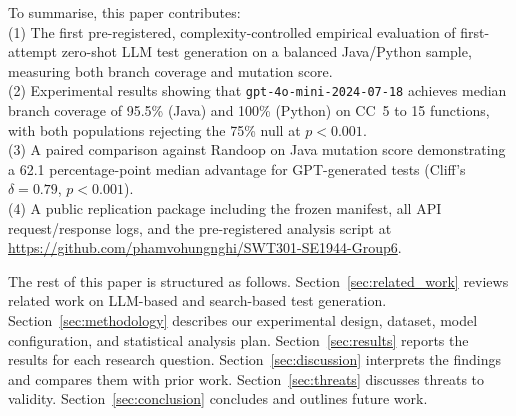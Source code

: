 To summarise, this paper contributes:\\
(1) The first pre-registered, complexity-controlled empirical evaluation of first-attempt zero-shot LLM test generation on a balanced Java/Python sample, measuring both branch coverage and mutation score.\\
(2) Experimental results showing that \texttt{gpt-4o-mini-2024-07-18} achieves median branch coverage of 95.5\% (Java) and 100\% (Python) on CC~5 to 15 functions, with both populations rejecting the 75\% null at $p < 0.001$.\\
(3) A paired comparison against Randoop on Java mutation score demonstrating a 62.1 percentage-point median advantage for GPT-generated tests (Cliff's $\delta = 0.79$, $p < 0.001$).\\
(4) A public replication package including the frozen manifest, all API request/response logs, and the pre-registered analysis script at \url{https://github.com/phamvohungnghi/SWT301-SE1944-Group6}.

The rest of this paper is structured as follows. Section~\ref{sec:related_work} reviews related work on LLM-based and search-based test generation. Section~\ref{sec:methodology} describes our experimental design, dataset, model configuration, and statistical analysis plan. Section~\ref{sec:results} reports the results for each research question. Section~\ref{sec:discussion} interprets the findings and compares them with prior work. Section~\ref{sec:threats} discusses threats to validity. Section~\ref{sec:conclusion} concludes and outlines future work.
